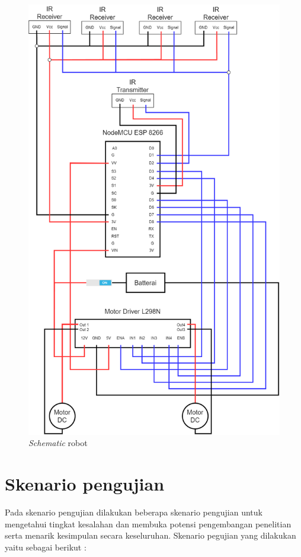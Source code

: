 \begin{figure}[H]
  \centering
  \includegraphics[width=0.5\linewidth]{gambar/schematic.png}
  \caption{\emph{Schematic} robot}
  \label{fig:schematic}
\end{figure}

\section{Skenario pengujian}
Pada skenario pengujian dilakukan beberapa skenario pengujian untuk mengetahui tingkat kesalahan dan membuka potensi pengembangan penelitian serta menarik kesimpulan secara keseluruhan. Skenario pegujian yang dilakukan yaitu sebagai berikut :
